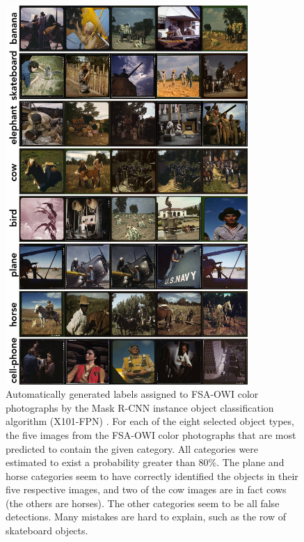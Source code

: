 \documentclass[10pt, a4paper]{article}
\begin{document}
\begin{figure}[!ht]
\begin{center}
\includegraphics[width=0.82\textwidth]{../figures/max_things_grid_labels.jpg}
\caption{Automatically generated labels assigned to FSA-OWI color photographs
by the Mask R-CNN instance object classification algorithm (X101-FPN)
\protect\cite{wu2019detectron2}. For each of the eight selected object types,
the five images from the FSA-OWI
color photographs that are most predicted to contain the given category.
All categories were estimated to exist a probability greater than 80\%. The
plane and horse categories seem to have correctly identified the objects in
their five respective images, and two of the cow images are in fact cows
(the others are horses). The other categories seem to be all false detections.
Many mistakes are hard to explain, such as the row of skateboard objects.
}
\label{fig:things}
\end{center}
\end{figure}
\end{document}
